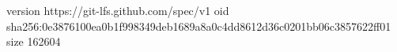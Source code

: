 version https://git-lfs.github.com/spec/v1
oid sha256:0e3876100ea0b1f998349deb1689a8a0c4dd8612d36c0201bb06c3857622ff01
size 162604
